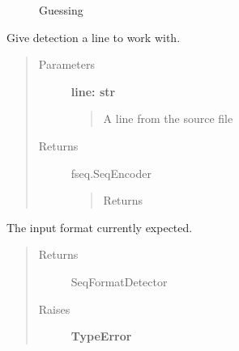 \documentclass[letterpaper,10pt,english]{sphinxmanual}
\begin{document}
\begin{fulllineitems}
\begin{fulllineitems}

\begin{description}
\item[{{\hyperref[fseq.reading:fseq.reading.seq_encoder.SeqEncoder.detectFormat]{}}}] \leavevmode
Guessing

\end{description}



\end{fulllineitems}


\begin{fulllineitems}
\label{fseq.reading:fseq.reading.seq_encoder.SeqEncoder.feedDetection}
Give detection a line to work with.
\begin{quote}\begin{description}
\item[{Parameters}] \leavevmode
\textbf{line: str}
\begin{quote}

A line from the source file
\end{quote}

\item[{Returns}] \leavevmode
fseq.SeqEncoder
\begin{quote}

Returns 
\end{quote}

\end{description}\end{quote}

\end{fulllineitems}


\begin{fulllineitems}
\label{fseq.reading:fseq.reading.seq_encoder.SeqEncoder.format}
The input format currently expected.
\begin{quote}\begin{description}
\item[{Returns}] \leavevmode
SeqFormatDetector

\item[{Raises}] \leavevmode
\textbf{TypeError}
\begin{quote}


\end{quote}
\end{description}
\end{quote}
\end{fulllineitems}
\end{fulllineitems}
\end{document}
